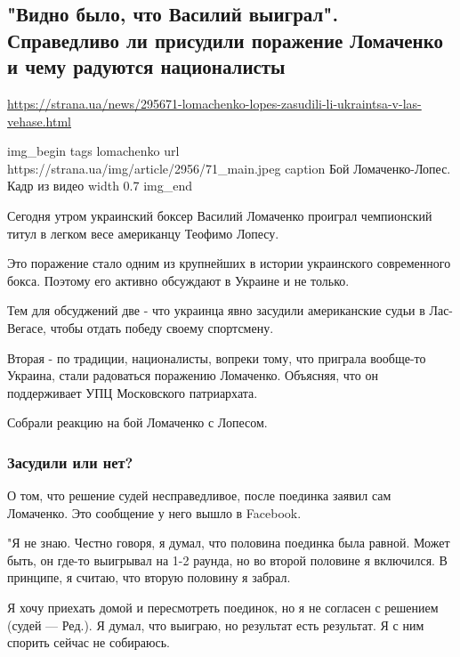  
 

\subsection{"Видно было, что Василий выиграл". Справедливо ли присудили поражение Ломаченко и чему радуются националисты}
\label{sec:18_10_2020.news.ua.strana.1.lomachenko_nazis}

\url{https://strana.ua/news/295671-lomachenko-lopes-zasudili-li-ukraintsa-v-las-vehase.html}

\ifcmt
img_begin 
	tags lomachenko
	url https://strana.ua/img/article/2956/71_main.jpeg
	caption Бой Ломаченко-Лопес. Кадр из видео
	width 0.7
img_end
\fi

Сегодня утром украинский боксер Василий Ломаченко проиграл чемпионский титул в
легком весе американцу Теофимо Лопесу. 

Это поражение стало одним из крупнейших в истории украинского современного
бокса. Поэтому его активно обсуждают в Украине и не только. 

Тем для обсуджений две - что украинца явно засудили американские судьи в
Лас-Вегасе, чтобы отдать победу своему спортсмену.

Вторая - по традиции, националисты, вопреки тому, что приграла вообще-то
Украина, стали радоваться поражению Ломаченко. Объясняя, что он поддерживает
УПЦ Московского патриархата. 

Собрали реакцию на бой Ломаченко с Лопесом. 

\subsubsection{Засудили или нет?}

О том, что решение судей несправедливое, после поединка заявил сам Ломаченко.
Это сообщение у него вышло в Facebook. 

"Я не знаю. Честно говоря, я думал, что половина поединка была равной. Может
быть, он где-то выигрывал на 1-2 раунда, но во второй половине я включился. В
принципе, я считаю, что вторую половину я забрал.

Я хочу приехать домой и пересмотреть поединок, но я не согласен с решением
(судей --- Ред.). Я думал, что выиграю, но результат есть результат. Я с ним
спорить сейчас не собираюсь.

